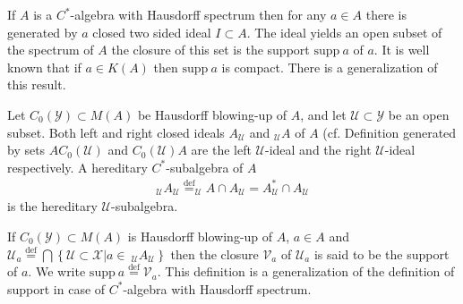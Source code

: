 \documentclass{beamer}
\theoremstyle{plain}
\newcommand{\be}{\begin{equation}}
\newcommand{\ee}{\end{equation}}
\newcommand{\supp}{\mathrm{supp}}
\newcommand{\sU}{\mathcal{U}}       %
\newcommand{\sV}{\mathcal{V}}       %
\newcommand{\sX}{\mathcal{X}}       %
\newcommand{\sY}{\mathcal{Y}}       %
\newcommand{\bydef}{\stackrel{\mathrm{def}}{=}}
\begin{document}
\begin{frame}
	If $A$ is a $C^*$-algebra with Hausdorff spectrum then for any $a\in A$ there is generated by $a$ closed two sided ideal $I\subset A$. The ideal yields an open subset of the spectrum of $A$ the closure of this set is the \alert{support} $\supp~a$ of $a$. It is well known  that if $a \in K\left(A \right)$ then  $\supp~a$ is compact. There is a generalization of this result.
\end{frame}
\begin{frame}
\begin{definition}\label{blowing_ideals_au_ua_defn}
	Let  $ C_0\left(\sY\right)\subset  M\left( A\right) $ be  Hausdorff blowing-up of $A$, and let $\sU \subset \sY$ be an open subset. Both   left and right  closed ideals $A_\sU$  and $_\sU A$ of $A$ (cf. Definition  generated by sets 	$AC_0\left( \sU\right)$ and $C_0\left( \sU\right)A$ are the \alert{left} $\sU$-\alert{ideal} and the \alert{right} $\sU$-\alert{ideal} respectively. A hereditary $C^*$-subalgebra of $A$
	\be\label{blowing_hereditary_u_eqn} 
	\begin{split}
		_\sU A_\sU \bydef		_\sU A\cap  A_\sU = A^*	_\sU \cap  A_\sU
	\end{split}
	\ee	
	is the \alert{hereditary} $\sU$-\alert{subalgebra}.
	
	\end{definition}
	
	\begin{definition}\label{blowing_support_defn}
		If $C_0\left( \sY\right) \subset M\left(A \right)$ is    {Hausdorff blowing-up} of $A$,  $a \in A$ and
		$
		\sU_a \bydef\bigcap 
		\left\{\left.{\sU} \subset \sX\right| a\in~_\sU A_{\sU} \right\}
		$
		then the  closure $\sV_a$  of $\sU_a$ is said to be the \alert{support} of $a$. We write $\supp~ a \bydef \sV_a$. This definition is a generalization of the definition of support in case of $C^*$-algebra with Hausdorff spectrum. 
	\end{definition}
	
\end{frame}
\end{document}
